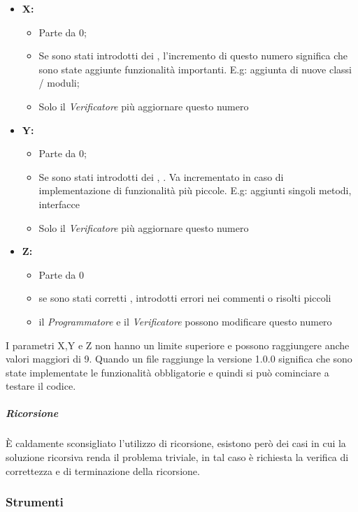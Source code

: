 			\begin{itemize}
				\item \textbf{X:} 
					\begin{itemize}
						\item Parte da 0;
						\item Se sono stati introdotti dei , l'incremento di questo numero significa che sono state aggiunte funzionalità importanti. E.g: aggiunta di nuove classi / moduli;
						\item Solo il \emph{Verificatore} più aggiornare questo numero
					\end{itemize}
				
				\item \textbf{Y:} 
					\begin{itemize}
						\item Parte da 0;
						\item Se sono stati introdotti dei , . Va incrementato in caso di implementazione di funzionalità più piccole. E.g: aggiunti singoli metodi, interfacce
						\item Solo il \emph{Verificatore} più aggiornare questo numero
					\end{itemize}

				\item \textbf{Z:}
					\begin{itemize}
						\item Parte da 0
						\item se sono stati corretti , introdotti errori nei commenti o risolti piccoli 
						\item il \emph{Programmatore} e il \emph{Verificatore} possono modificare questo numero
					\end{itemize}
			\end{itemize}
			I parametri X,Y e Z non hanno un limite superiore e possono raggiungere anche valori maggiori di 9.
			Quando un file raggiunge la versione 1.0.0 significa che sono state implementate le funzionalità obbligatorie e quindi si può cominciare a testare il codice.
			\subparagraph{Ricorsione} \Spazio
			È caldamente sconsigliato l'utilizzo di ricorsione, esistono però dei casi in cui la soluzione ricorsiva renda il problema triviale, in tal caso è richiesta la verifica di correttezza e di terminazione della ricorsione.
			
	\subsubsection{Strumenti}
